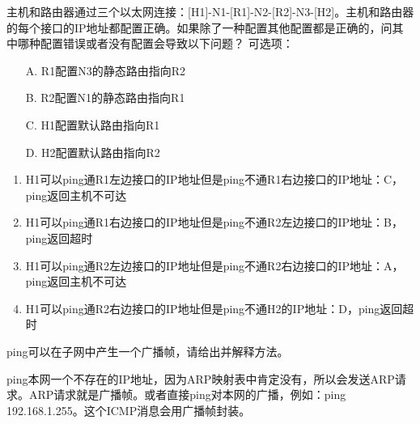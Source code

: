 \begin{example}
	主机和路由器通过三个以太网连接：[H1]-N1-[R1]-N2-[R2]-N3-[H2]。主机和路由器的每个接口的IP地址都配置正确。如果除了一种配置其他配置都是正确的，问其中哪种配置错误或者没有配置会导致以下问题？
	可选项：
	\begin{itemize}
		\item [A.]R1配置N3的静态路由指向R2
		\item [B.]R2配置N1的静态路由指向R1
		\item [C.]H1配置默认路由指向R1
		\item [D.]H2配置默认路由指向R2
	\end{itemize}
\end{example}
\begin{analysis}
	\begin{enumerate}
	\item H1可以ping通R1左边接口的IP地址但是ping不通R1右边接口的IP地址：C，ping返回主机不可达
	\item H1可以ping通R1右边接口的IP地址但是ping不通R2左边接口的IP地址：B，ping返回超时
	\item H1可以ping通R2左边接口的IP地址但是ping不通R2右边接口的IP地址：A，ping返回主机不可达
	\item H1可以ping通R2右边接口的IP地址但是ping不通H2的IP地址：D，ping返回超时
	\end{enumerate}
\end{analysis}
\begin{example}
	ping可以在子网中产生一个广播帧，请给出并解释方法。
\end{example}
\begin{analysis}
	ping本网一个不存在的IP地址，因为ARP映射表中肯定没有，所以会发送ARP请求。ARP请求就是广播帧。或者直接ping对本网的广播，例如：ping 192.168.1.255。这个ICMP消息会用广播帧封装。
\end{analysis}

